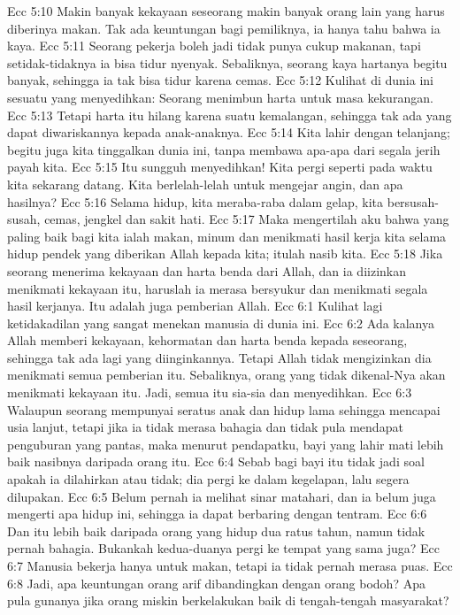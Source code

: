 Ecc 5:10  Makin banyak kekayaan seseorang makin banyak orang lain yang harus diberinya makan. Tak ada keuntungan bagi pemiliknya, ia hanya tahu bahwa ia kaya.
Ecc 5:11  Seorang pekerja boleh jadi tidak punya cukup makanan, tapi setidak-tidaknya ia bisa tidur nyenyak. Sebaliknya, seorang kaya hartanya begitu banyak, sehingga ia tak bisa tidur karena cemas.
Ecc 5:12  Kulihat di dunia ini sesuatu yang menyedihkan: Seorang menimbun harta untuk masa kekurangan.
Ecc 5:13  Tetapi harta itu hilang karena suatu kemalangan, sehingga tak ada yang dapat diwariskannya kepada anak-anaknya.
Ecc 5:14  Kita lahir dengan telanjang; begitu juga kita tinggalkan dunia ini, tanpa membawa apa-apa dari segala jerih payah kita.
Ecc 5:15  Itu sungguh menyedihkan! Kita pergi seperti pada waktu kita sekarang datang. Kita berlelah-lelah untuk mengejar angin, dan apa hasilnya?
Ecc 5:16  Selama hidup, kita meraba-raba dalam gelap, kita bersusah-susah, cemas, jengkel dan sakit hati.
Ecc 5:17  Maka mengertilah aku bahwa yang paling baik bagi kita ialah makan, minum dan menikmati hasil kerja kita selama hidup pendek yang diberikan Allah kepada kita; itulah nasib kita.
Ecc 5:18  Jika seorang menerima kekayaan dan harta benda dari Allah, dan ia diizinkan menikmati kekayaan itu, haruslah ia merasa bersyukur dan menikmati segala hasil kerjanya. Itu adalah juga pemberian Allah.
Ecc 6:1  Kulihat lagi ketidakadilan yang sangat menekan manusia di dunia ini.
Ecc 6:2  Ada kalanya Allah memberi kekayaan, kehormatan dan harta benda kepada seseorang, sehingga tak ada lagi yang diinginkannya. Tetapi Allah tidak mengizinkan dia menikmati semua pemberian itu. Sebaliknya, orang yang tidak dikenal-Nya akan menikmati kekayaan itu. Jadi, semua itu sia-sia dan menyedihkan.
Ecc 6:3  Walaupun seorang mempunyai seratus anak dan hidup lama sehingga mencapai usia lanjut, tetapi jika ia tidak merasa bahagia dan tidak pula mendapat penguburan yang pantas, maka menurut pendapatku, bayi yang lahir mati lebih baik nasibnya daripada orang itu.
Ecc 6:4  Sebab bagi bayi itu tidak jadi soal apakah ia dilahirkan atau tidak; dia pergi ke dalam kegelapan, lalu segera dilupakan.
Ecc 6:5  Belum pernah ia melihat sinar matahari, dan ia belum juga mengerti apa hidup ini, sehingga ia dapat berbaring dengan tentram.
Ecc 6:6  Dan itu lebih baik daripada orang yang hidup dua ratus tahun, namun tidak pernah bahagia. Bukankah kedua-duanya pergi ke tempat yang sama juga?
Ecc 6:7  Manusia bekerja hanya untuk makan, tetapi ia tidak pernah merasa puas.
Ecc 6:8  Jadi, apa keuntungan orang arif dibandingkan dengan orang bodoh? Apa pula gunanya jika orang miskin berkelakukan baik di tengah-tengah masyarakat?
